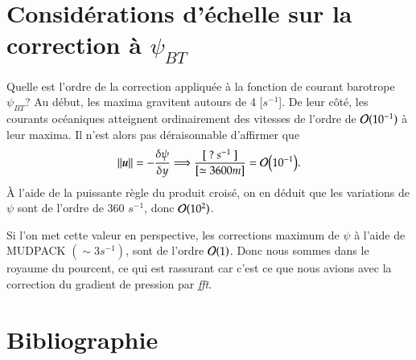 \documentclass[10pt]{article}
\numberwithin{equation}{section}
\newcommand{\uu}{\vb*{u}}
\begin{document}
\section{Considérations d'échelle sur la correction à \(\psi_{BT}\)}
\label{sec:org764357e}

Quelle est l'ordre de la correction appliquée à la fonction de courant barotrope \(\psi_{BT}\)?
Au début, les maxima gravitent autours de 4 [\(s^{-1}\)].
De leur côté, les courants océaniques atteignent ordinairement des vitesses de l'ordre de \(\order*{10^{-1}}\) à leur maxima.
Il n'est alors pas déraisonnable d'affirmer que 
\begin{equation}
\norm{\uu} = - \frac{\delta \psi}{\delta y} \Longrightarrow \frac{[\ ?\ s^{-1}\ ]}{[\simeq 3600m]} = \order{10^{-1}}.
\end{equation}
À l'aide de la puissante règle du produit croisé, on en déduit que les variations de \(\psi\) sont de l'ordre de 360 \(s^{-1}\), donc \(\order*{10^2}\).\bigskip

Si l'on met cette valeur en perspective, les corrections maximum de \(\psi\) à l'aide de MUDPACK \((\sim 3 s^{-1})\), sont de l'ordre \(\order*{1}\).
Donc nous sommes dans le royaume du pourcent, ce qui est rassurant car c'est ce que nous avions avec la correction du gradient de pression par \emph{fft}. 

\section{Bibliographie}
\label{sec:orgb24cfb5}
\end{document}
